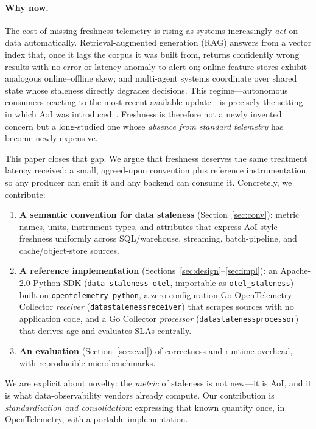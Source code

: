 \documentclass[11pt]{article}
\begin{document}
\paragraph{Why now.}
The cost of missing freshness telemetry is rising as systems increasingly
\emph{act} on data automatically. Retrieval-augmented generation (RAG) answers
from a vector index that, once it lags the corpus it was built from, returns
confidently wrong results with no error or latency anomaly to alert on; online
feature stores exhibit analogous online--offline skew; and multi-agent systems
coordinate over shared state whose staleness directly degrades decisions. This
regime---autonomous consumers reacting to the most recent available
update---is precisely the setting in which AoI was
introduced~\cite{kaul2012,yates2021survey}. Freshness is therefore not a newly
invented concern but a long-studied one whose \emph{absence from standard
telemetry} has become newly expensive.

This paper closes that gap. We argue that freshness deserves the same
treatment latency received: a small, agreed-upon convention plus reference
instrumentation, so any producer can emit it and any backend can consume it.
Concretely, we contribute:
\begin{enumerate}[nosep]
  \item \textbf{A semantic convention for data staleness} (Section~\ref{sec:conv}):
  metric names, units, instrument types, and attributes that express AoI-style
  freshness uniformly across SQL/warehouse, streaming, batch-pipeline, and
  cache/object-store sources.
  \item \textbf{A reference implementation} (Sections~\ref{sec:design}--\ref{sec:impl}):
  an Apache-2.0 Python SDK (\texttt{data-staleness-otel}, importable as
  \texttt{otel\_staleness}) built on
  \texttt{opentelemetry-python}, a zero-configuration Go OpenTelemetry Collector
  \emph{receiver} (\texttt{datastalenessreceiver}) that scrapes sources with no
  application code, and a Go Collector \emph{processor}
  (\texttt{datastalenessprocessor}) that derives age and evaluates SLAs centrally.
  \item \textbf{An evaluation} (Section~\ref{sec:eval}) of correctness and
  runtime overhead, with reproducible microbenchmarks.
\end{enumerate}
We are explicit about novelty: the \emph{metric} of staleness is not new---it
is AoI, and it is what data-observability vendors already compute. Our
contribution is \emph{standardization and consolidation}: expressing that known
quantity once, in OpenTelemetry, with a portable implementation.
\end{document}
